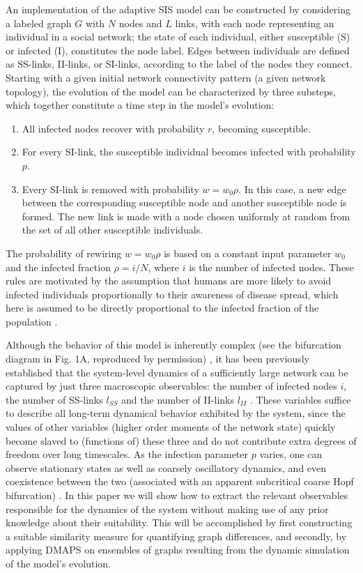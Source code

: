 An implementation of the adaptive SIS model can be constructed by
considering a labeled graph $G$ with $N$ nodes and $L$ links, with
each node representing an individual in a social network; the state of
each individual, either susceptible (S) or infected (I), constitutes
the node label. Edges between individuals are defined as SS-links,
II-links, or SI-links, according to the label of the nodes they
connect. Starting with a given initial network connectivity pattern (a
given network topology), the evolution of the model can be
characterized by three substeps, which together constitute a time step
in the model's evolution:

\begin{enumerate}
  \item All infected nodes recover with
    probability $r$, becoming susceptible.
  \item For every SI-link, the
    susceptible individual becomes infected with probability $p$.
  \item Every SI-link is removed with probability $w = w_0 \rho$. In this case, a
    new edge between the corresponding susceptible node and another
    susceptible node is formed. The new link is made with a node
    chosen uniformly at random from the set of all other susceptible
    individuals.
\end{enumerate}

The probability of rewiring $w = w_0 \rho$ is based on a constant
input parameter $w_0$ and the infected fraction $\rho = i/N$, where
$i$ is the number of infected nodes. These rules are motivated by the
assumption that humans are more likely to avoid infected individuals
proportionally to their awareness of disease spread, which here is
assumed to be directly proportional to the infected fraction of the
population \cite{gross_epidemic_2006}.

Although the behavior of this model is inherently complex (see the
bifurcation diagram in Fig. 1A, reproduced by permission)
\cite{gross_robust_2008}, it has been previously established that the
system-level dynamics of a sufficiently large network can be captured
by just three macroscopic observables: the number of infected nodes $i$,
the number of SS-links $l_{SS}$ and the number of II-links $l_{II}$ . These variables
suffice to describe all long-term dynamical behavior exhibited by the
system, since the values of other variables (higher order moments of
the network state) quickly become slaved to (functions of) these three
and do not contribute extra degrees of freedom over long
timescales. As the infection parameter $p$ varies, one can observe
stationary states as well as coarsely oscillatory dynamics, and even
coexistence between the two (associated with an apparent subcritical
coarse Hopf bifurcation) \cite{holmes_turbulence_2012}.  In this paper
we will show how to extract the relevant observables responsible for
the dynamics of the system without making use of any prior knowledge
about their suitability. This will be accomplished by first
constructing a suitable similarity measure for quantifying graph
differences, and secondly, by applying DMAPS on ensembles of graphs
resulting from the dynamic simulation of the model’s evolution.


